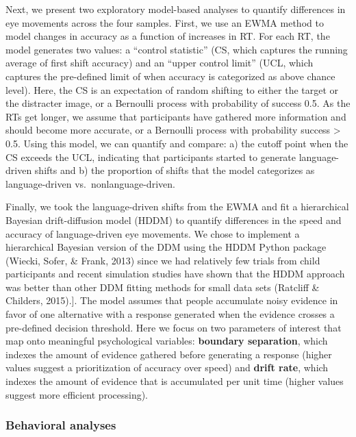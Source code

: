 \documentclass[10pt, letterpaper]{article}
\begin{document}
Next, we present two exploratory model-based analyses to quantify
differences in eye movements across the four samples. First, we use an
EWMA method to model changes in accuracy as a function of increases in
RT. For each RT, the model generates two values: a ``control statistic''
(CS, which captures the running average of first shift accuracy) and an
``upper control limit'' (UCL, which captures the pre-defined limit of
when accuracy is categorized as above chance level). Here, the CS is an
expectation of random shifting to either the target or the distracter
image, or a Bernoulli process with probability of success 0.5. As the
RTs get longer, we assume that participants have gathered more
information and should become more accurate, or a Bernoulli process with
probability success \textgreater{} 0.5. Using this model, we can
quantify and compare: a) the cutoff point when the CS exceeds the UCL,
indicating that participants started to generate language-driven shifts
and b) the proportion of shifts that the model categorizes as
language-driven vs.~nonlanguage-driven.

Finally, we took the language-driven shifts from the EWMA and fit a
hierarchical Bayesian drift-diffusion model (HDDM) to quantify
differences in the speed and accuracy of language-driven eye movements.
We chose to implement a hierarchical Bayesian version of the DDM using
the HDDM Python package (Wiecki, Sofer, \& Frank, 2013) since we had
relatively few trials from child participants and recent simulation
studies have shown that the HDDM approach was better than other DDM
fitting methods for small data sets (Ratcliff \& Childers, 2015).{]}.
The model assumes that people accumulate noisy evidence in favor of one
alternative with a response generated when the evidence crosses a
pre-defined decision threshold. Here we focus on two parameters of
interest that map onto meaningful psychological variables:
\textbf{boundary separation}, which indexes the amount of evidence
gathered before generating a response (higher values suggest a
prioritization of accuracy over speed) and \textbf{drift rate}, which
indexes the amount of evidence that is accumulated per unit time (higher
values suggest more efficient processing).

\subsubsection{Behavioral analyses}\label{behavioral-analyses}
\end{document}
